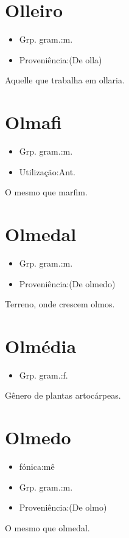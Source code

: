 \section{Olleiro}
\begin{itemize}
\item {Grp. gram.:m.}
\end{itemize}
\begin{itemize}
\item {Proveniência:(De \textunderscore olla\textunderscore )}
\end{itemize}
Aquelle que trabalha em ollaria.
\section{Olmafi}
\begin{itemize}
\item {Grp. gram.:m.}
\end{itemize}
\begin{itemize}
\item {Utilização:Ant.}
\end{itemize}
O mesmo que \textunderscore marfim\textunderscore .
\section{Olmedal}
\begin{itemize}
\item {Grp. gram.:m.}
\end{itemize}
\begin{itemize}
\item {Proveniência:(De \textunderscore olmedo\textunderscore )}
\end{itemize}
Terreno, onde crescem olmos.
\section{Olmédia}
\begin{itemize}
\item {Grp. gram.:f.}
\end{itemize}
Gênero de plantas artocárpeas.
\section{Olmedo}
\begin{itemize}
\item {fónica:mê}
\end{itemize}
\begin{itemize}
\item {Grp. gram.:m.}
\end{itemize}
\begin{itemize}
\item {Proveniência:(De \textunderscore olmo\textunderscore )}
\end{itemize}
O mesmo que \textunderscore olmedal\textunderscore .
